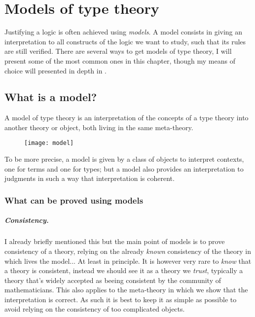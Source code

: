 \chapter{Models of type theory}

Justifying a logic is often achieved using \emph{models}. A model consists
in giving an interpretation to all constructs of the logic we want to study,
such that its rules are still verified.
There are several ways to get models of type theory, I will present some of the
most common ones in this chapter, though my means of choice will presented in
depth in .

\section{What is a model?}

A model of type theory is an interpretation of the concepts of a type theory
into another theory or object, both living in the same meta-theory.
\begin{figure}[hb]
  \texttt{[image: model]}
\end{figure}
To be more precise, a model is given by a class of objects to interpret
contexts, one for terms and one for types; but a model also provides an
interpretation to judgments in such a way that interpretation is coherent.

\subsection{What can be proved using models}

\paragraph{Consistency.}

I already briefly mentioned this but the main point of models is to prove
consistency of a theory, relying on the already \emph{known} consistency of the
theory in which lives the model... At least in principle. It is however very
rare to \emph{know} that a theory is consistent, instead
we should see it as a theory we \emph{trust}, typically a theory that's widely
accepted as beeing consistent by the community of mathematicians.
This also applies to the meta-theory in which we show that the interpretation is
correct. As such it is best to keep it as simple as possible to avoid relying on
the consistency of too complicated objects.

